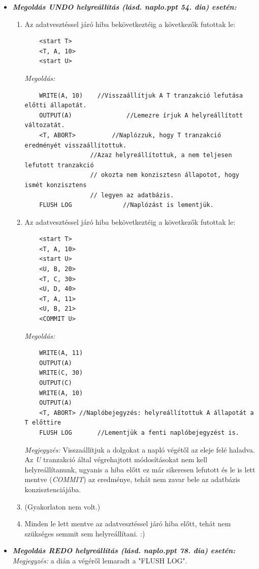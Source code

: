 \documentclass[a4paper,11.5pt, table]{article}
\begin{document}
	\begin{itemize}
		\item \textbf{\textit{Megoldás UNDO helyreállítás \textit{(lásd. naplo.ppt 54. dia)} esetén:}}
			\begin{enumerate}[label=\alph*)]
				
				
				\item Az adatvesztéssel járó hiba bekövetkeztéig a következők futottak le:
				\begin{lstlisting}
	<start T> 
	<T, A, 10> 
	<start U> 
				\end{lstlisting}
				\textit{Megoldás:}
				\begin{lstlisting}
	WRITE(A, 10)	//Visszaállítjuk A T tranzakció lefutása előtti állapotát.
	OUTPUT(A)				//Lemezre írjuk A helyreállított változatát.
	<T, ABORT>			//Naplózzuk, hogy T tranzakció eredményét visszaállítottuk.
				  //Azaz helyreállítottuk, a nem teljesen lefutott tranzakció
				  // okozta nem konzisztesn állapotot, hogy ismét konzisztens
				  // legyen az adatbázis.
	FLUSH LOG			   //Naplózást is lementjük.
				\end{lstlisting}
				
				
				\item Az adatvesztéssel járó hiba bekövetkeztéig a következők futottak le:
				\begin{lstlisting}
	<start T> 
	<T, A, 10> 
	<start U> 
	<U, B, 20> 
	<T, C, 30> 
	<U, D, 40>
	<T, A, 11>
	<U, B, 21>  
	<COMMIT U>
				\end{lstlisting}
				\textit{Megoldás:}
				\begin{lstlisting}
	WRITE(A, 11)
	OUTPUT(A)
	WRITE(C, 30)
	OUTPUT(C)
	WRITE(A, 10)
	OUTPUT(A)
	<T, ABORT> //Naplóbejegyzés: helyreállítottuk A állapotát a T előttire
	FLUSH LOG		//Lementjük a fenti naplóbejegyzést is.
				\end{lstlisting}
				\textit{Megjegyzés:} Visszaállítjuk a dolgokat a napló végétől az eleje felé haladva. Az \textit{U} tranzakció által végrehajtott módosításokat nem kell helyreállítanunk, ugyanis a hiba előtt ez már sikeresen lefutott és le is lett mentve (\textit{COMMIT}) az eredménye, tehát nem zavar bele az adatbázis konzisztenciájába.
				
				
				\item (Gyakorlaton nem volt.)
				
				\item Minden le lett mentve az adatvesztéssel járó hiba előtt, tehát nem szükséges semmit sem helyreállítani. :)				
			\end{enumerate}
		\item \textbf{\textit{Megoldás REDO helyreállítás (lásd. naplo.ppt 78. dia) esetén:}}\\
		\textit{Megjegyzés:} a dián a végéről lemaradt a "FLUSH LOG".
		

\end{itemize}
\end{document}
